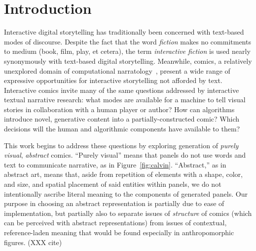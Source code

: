 \section{Introduction}

Interactive digital storytelling has traditionally been concerned with
text-based modes of discourse. Despite the fact that the word {\em fiction}
makes no commitments to medium (book, film, play, et cetera), the term {\em
interactive fiction} is used nearly synonymously with text-based digital
storytelling. Meanwhile, comics, a relatively unexplored domain of
computational narratology~\cite{mani2012computational}, present a wide
range of expressive opportunities for interactive storytelling not afforded
by text.  Interactive comics invite many of the same questions addressed by
interactive textual narrative research: what modes are available for a
machine to tell visual stories in collaboration with a human player or
author? How can algorithms introduce novel, generative content into a
partially-constructed comic?  Which decisions will the human and
algorithmic components have available to them?

This work begins to address these questions by exploring generation of {\em
purely visual}, {\em abstract} comics. ``Purely visual'' means that panels
do not use words and text to communicate narrative, as in
Figure~\ref{fig:calvin}. ``Abstract,'' as in abstract art, means that,
aside from repetition of elements with a shape, color, and size, and
spatial placement of said entities within panels, we do not intentionally
ascribe literal meaning to the components of generated panels. Our purpose
in choosing an abstract representation is partially due to ease of
implementation, but partially also to separate issues of {\em structure} of
comics (which can be perceived with abstract representations) from issues
of contextual, reference-laden meaning that would be found especially in
anthropomorphic figures. (XXX cite)


